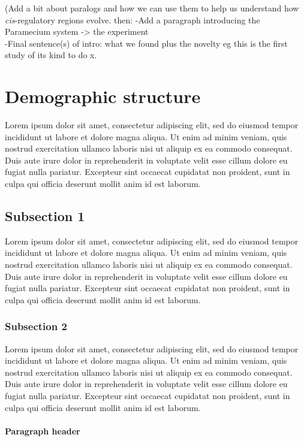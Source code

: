\documentclass[nogrid]{MBE}%
\begin{document}
(Add a bit about paralogs and how we can use them to help us understand how \textit{cis}-regulatory regions evolve. then:
-Add a paragraph introducing the Paramecium system -> the experiment\\
-Final sentence(s) of intro: what we found plus the novelty eg this is the first study of its kind to do x.

\section{Demographic structure}

Lorem ipsum dolor sit amet, consectetur adipiscing elit, sed do eiusmod tempor incididunt ut labore et dolore magna aliqua. Ut enim ad minim veniam, quis nostrud exercitation ullamco laboris nisi ut aliquip ex ea commodo consequat. Duis aute irure dolor in reprehenderit in voluptate velit esse cillum dolore eu fugiat nulla pariatur. Excepteur sint occaecat cupidatat non proident, sunt in culpa qui officia deserunt mollit anim id est laborum.

\subsection{Subsection 1}

Lorem ipsum dolor sit amet, consectetur adipiscing elit, sed do eiusmod tempor incididunt ut labore et dolore magna aliqua. Ut enim ad minim veniam, quis nostrud exercitation ullamco laboris nisi ut aliquip ex ea commodo consequat. Duis aute irure dolor in reprehenderit in voluptate velit esse cillum dolore eu fugiat nulla pariatur. Excepteur sint occaecat cupidatat non proident, sunt in culpa qui officia deserunt mollit anim id est laborum.


\subsubsection{Subsection 2}

Lorem ipsum dolor sit amet, consectetur adipiscing elit, sed do eiusmod tempor incididunt ut labore et dolore magna aliqua. Ut enim ad minim veniam, quis nostrud exercitation ullamco laboris nisi ut aliquip ex ea commodo consequat. Duis aute irure dolor in reprehenderit in voluptate velit esse cillum dolore eu fugiat nulla pariatur. Excepteur sint occaecat cupidatat non proident, sunt in culpa qui officia deserunt mollit anim id est laborum.


\paragraph{Paragraph header} 
\end{document}
